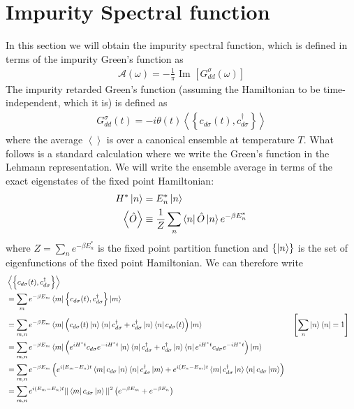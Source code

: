 \documentclass[12pt,twoside]{report}
\numberwithin{equation}{section}
\begin{document}
\section{Impurity Spectral function}
In this section we will obtain the impurity spectral function, which is defined in terms of the impurity Green's function as
\begin{equation}\begin{aligned}
	\mathcal{A(\omega)} = -\frac{1}{\pi}\text{ Im }\left[G_{dd}^\sigma\left( \omega \right) \right] 
\end{aligned}\end{equation}
The impurity retarded Green's function (assuming the Hamiltonian to be time-independent, which it is) is defined as
\begin{equation}\begin{aligned}
	G_{dd}^\sigma(t) = -i\theta(t) \left<\left\{ c_{d\sigma}(t),c^\dagger_{d\sigma} \right\}  \right>
\end{aligned}\end{equation}
where the average \(\left< \right>\) is over a canonical ensemble at temperature \(T\). What follows is a standard calculation where we write the Green's function in the Lehmann representation. We will write the ensemble average in terms of the exact eigenstates of the fixed point Hamiltonian:
\begin{equation}\begin{aligned}
	H^* \ket{n} &= E_n^* \ket{n}\\
	\left<\hat O \right> &\equiv \frac{1}{Z}\sum_n \bra{n} \hat O \ket{n} e^{-\beta E_n^*}
\end{aligned}\end{equation}
where \(Z = \sum_n e^{-\beta E_n^*}\) is the fixed point partition function and \(\left\{ \ket{n} \right\} \) is the set of eigenfunctions of the fixed point Hamiltonian. We can therefore write
\begin{equation}\begin{aligned}
	&\left<\left\{ c_{d\sigma}(t),c^\dagger_{d\sigma} \right\}  \right> \\
	&= \sum_{m}e^{-\beta E_m}\bra{m}\left\{ c_{d\sigma}(t),c^\dagger_{d\sigma} \right\} \ket{m}\\
	&= \sum_{m,n}e^{-\beta E_m}\bra{m}\left( c_{d\sigma}(t)\ket{n}\bra{n}c^\dagger_{d\sigma} + c^\dagger_{d\sigma}\ket{n}\bra{n}c_{d\sigma}(t)\right) \ket{m} && \left[\sum_n \ket{n}\bra{n} = 1\right]  \\
	&= \sum_{m,n}e^{-\beta E_m}\bra{m}\left( e^{iH^* t}c_{d\sigma}e^{-iH^* t}\ket{n}\bra{n}c^\dagger_{d\sigma} + c^\dagger_{d\sigma}\ket{n}\bra{n}e^{iH^* t}c_{d\sigma}e^{-iH^* t}\right) \ket{m}\\
	&= \sum_{m,n}e^{-\beta E_m}\left( e^{i\left( E_m - E_n \right)  t}\bra{m}c_{d\sigma}\ket{n}\bra{n}c^\dagger_{d\sigma} \ket{m} + e^{i\left( E_n - E_m \right)  t}\bra{m}c^\dagger_{d\sigma}\ket{n}\bra{n}c_{d\sigma} \ket{m}\right)\\
	&= \sum_{m,n}e^{i\left( E_m - E_n \right)  t}||\bra{m}c_{d\sigma}\ket{n}||^2\left( e^{-\beta E_m} + e^{-\beta E_n}\right)\\
\end{aligned}\end{equation}
\end{document}
